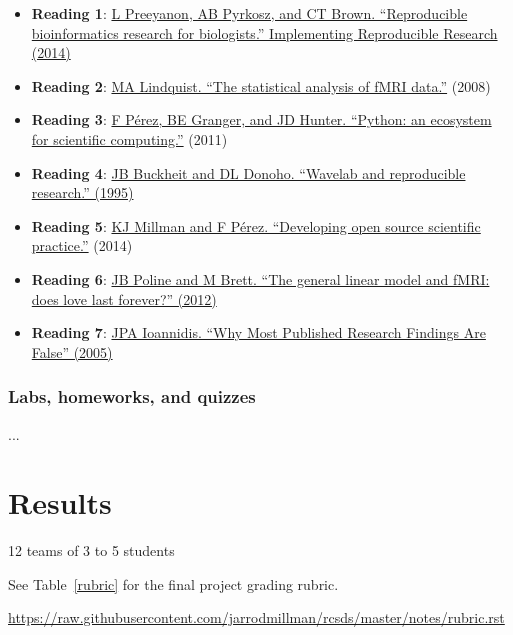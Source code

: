 \begin{itemize}
\item \textbf{Reading 1}: \href{https://osf.io/zqbu2}{L Preeyanon, AB Pyrkosz, and CT Brown.
             ``Reproducible bioinformatics research for biologists.''
Implementing Reproducible Research (2014)}
\item \textbf{Reading 2}: \href{http://arxiv.org/pdf/0906.3662v1}{MA Lindquist. ``The statistical analysis of fMRI data.''}
(2008)
\item \textbf{Reading 3}: \href{http://www.computer.org/cms/Computer.org/ComputingNow/issues/2015/04/T-mcs2011020013.pdf}{F P\'{e}rez, BE Granger, and JD Hunter.
              ``Python: an ecosystem for scientific computing.''}
(2011)
\item \textbf{Reading 4}: \href{http://statweb.stanford.edu/~wavelab/Wavelab_850/wavelab.pdf}{JB Buckheit and DL Donoho.
``Wavelab and reproducible research.'' (1995)}
\item \textbf{Reading 5}: \href{http://www.jarrodmillman.com/publications/millman2014developing.pdf}{KJ Millman and F P\'{e}rez.
              ``Developing open source scientific practice.''}
(2014)
\item \textbf{Reading 6}: \href{http://matthew.dynevor.org/_downloads/does_glm_love.pdf}{JB Poline and M Brett. ``The general linear model and fMRI: does love last forever?'' (2012)}
\item \textbf{Reading 7}: \href{http://journals.plos.org/plosmedicine/article?id=10.1371/journal.pmed.0020124}{JPA Ioannidis. ``Why Most Published Research Findings Are False'' (2005)}
\end{itemize}

\subsubsection{Labs, homeworks, and quizzes}


...


\section{Results}

12 teams of 3 to 5 students

See Table~\ref{rubric} for the final project grading rubric.

\url{https://raw.githubusercontent.com/jarrodmillman/rcsds/master/notes/rubric.rst}

